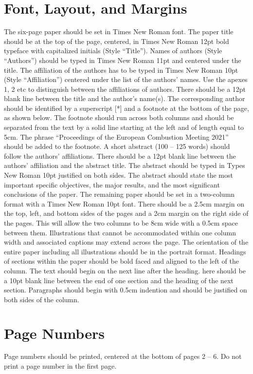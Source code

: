 \documentclass[twocolumn,10pt,a4paper]{ecm}
\begin{document}
\section*{Font, Layout, and Margins}
The six-page paper should be set in Times New Roman font.
The paper title should be at the top of the page, centered, in Times New Roman 12pt bold typeface with capitalized initials (Style “Title”).
Names of authors (Style “Authors”) should be typed in Times New Roman 11pt and centered under the title.
The affiliation of the authors has to be typed in Times New Roman 10pt (Style “Affiliation”) centered under the list of the authors’ names.
Use the apexes 1, 2 etc to distinguish between the affiliations of authors.
There should be a 12pt blank line between the title and the author’s name(s).
The corresponding author should be identified by a superscript [*] and a footnote at the bottom of the page, as shown below. The footnote should run across both columns and should be separated from the text by a solid line starting at the left and of length equal to 5cm.
The phrase “Proceedings of the European Combustion Meeting 2021” should be added to the footnote.
A short abstract (100 – 125 words) should follow the authors’ affiliations.
There should be a 12pt blank line between the authors’ affiliation and the abstract title.
The abstract should be typed in Types New Roman 10pt justified on both sides.
The abstract should state the most important specific objectives, the major results, and the most significant conclusions of the paper.
The remaining paper should be set in a two-column format with a Times New Roman 10pt font.
There should be a 2.5cm margin on the top, left, and bottom sides of the pages and a 2cm margin on the right side of the pages.
This will allow the two columns to be 8cm wide with a 0.5cm space between them.
Illustrations that cannot be accommodated within one column width and associated captions may extend across the page.
The orientation of the entire paper including all illustrations should be in the portrait format.
Headings of sections within the paper should be bold faced and aligned to the left of the column.
The text should begin on the next line after the heading.
here should be a 10pt blank line between the end of one section and the heading of the next section.
Paragraphs should begin with 0.5cm indention and should be justified on both sides of the column.

\section*{Page Numbers}
Page numbers should be printed, centered at the bottom of pages 2 – 6.
Do not print a page number in the first page.
\end{document}
